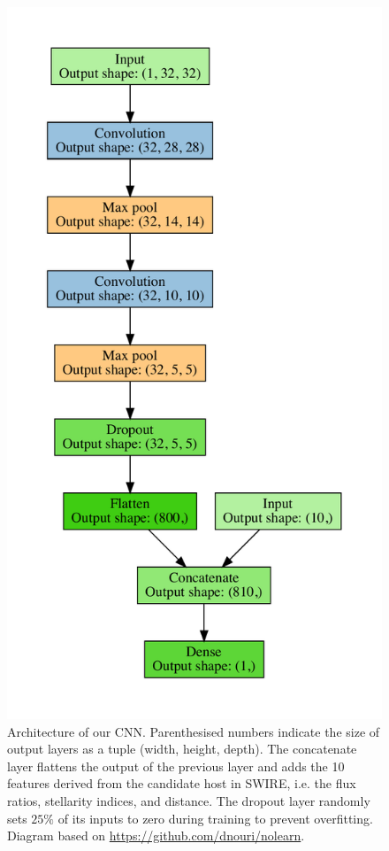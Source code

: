 \documentclass[fleqn,usenatbib,usedcolumn]{mnras}
\newcommand{\edited}[1]{#1}
\begin{document}
    \begin{figure}
      \includegraphics[width=\linewidth]{images/cnn_model_graph}
      \caption{Architecture of our CNN. \edited{Parenthesised numbers indicate
      the size of output layers as a tuple (width, height, depth).} The
      concatenate layer flattens the output of the previous layer and adds the
      10 features derived from the candidate host in SWIRE, i.e. the flux
      ratios, stellarity indices, and distance. The dropout layer randomly
      sets $25\%$ of its inputs to zero during training to prevent
      overfitting. Diagram based on \url{ https://github.com/dnouri/nolearn}.}
      \label{fig:cnn}
    \end{figure}
\end{document}
